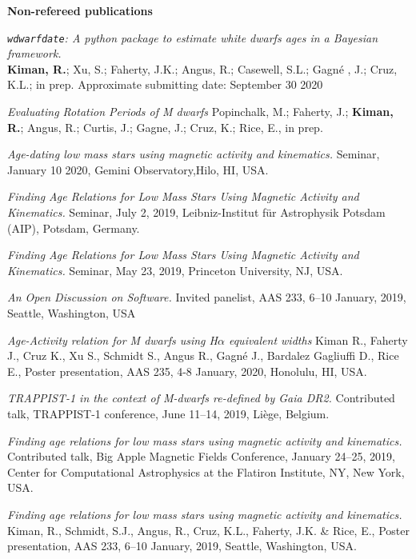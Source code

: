 \documentclass[10pt]{cv}
\begin{document}
\begin{llist}
\textbf{Non-refereed publications}

\textit{\texttt{wdwarfdate}: A python package to estimate white dwarfs ages in a Bayesian framework.}\\
\textbf{Kiman, R.}; Xu, S.; Faherty, J.K.; Angus, R.; Casewell, S.L.; Gagn\'e , J.; Cruz, K.L.; in prep. Approximate submitting date: September 30 2020

\textit{Evaluating Rotation Periods of M dwarfs}
Popinchalk, M.; Faherty, J.; \textbf{Kiman, R.}; Angus, R.; Curtis, J.; Gagne, J.; Cruz, K.; Rice, E., in prep.


\textit{Age-dating low mass stars using magnetic activity and kinematics.} Seminar, January 10 2020, Gemini Observatory,Hilo, HI, USA.

\textit{Finding Age Relations for Low Mass Stars Using Magnetic Activity and Kinematics.} Seminar, July 2, 2019, Leibniz-Institut f\"{u}r Astrophysik Potsdam (AIP), Potsdam, Germany.

\textit{Finding Age Relations for Low Mass Stars Using Magnetic Activity and Kinematics.} Seminar, May 23, 2019, Princeton University, NJ, USA. 

\textit{An Open Discussion on Software.} Invited panelist, AAS 233, 6--10 January, 2019, Seattle, Washington, USA


\textit{Age-Activity relation for M dwarfs using H$\alpha$ equivalent widths} Kiman R., Faherty J., Cruz K., Xu S., Schmidt S., Angus R., Gagn\'e J., Bardalez Gagliuffi D., Rice E., Poster presentation, AAS 235, 4-8 January, 2020, Honolulu, HI, USA.

\textit{TRAPPIST-1 in the context of M-dwarfs re-defined by Gaia DR2.} Contributed talk, TRAPPIST-1 conference, June 11--14, 2019, Li\`ege, Belgium.

\textit{Finding age relations for low mass stars using magnetic activity and kinematics.} Contributed talk, Big Apple Magnetic Fields Conference, January 24--25, 2019, Center for Computational Astrophysics at the Flatiron Institute, NY, New York, USA. 

\textit{Finding age relations for low mass stars using magnetic activity and kinematics.} Kiman, R., Schmidt, S.J., Angus, R., Cruz, K.L., Faherty, J.K. \& Rice, E., Poster presentation, AAS 233, 6--10 January, 2019, Seattle, Washington, USA.


\end{llist}
\end{document}
